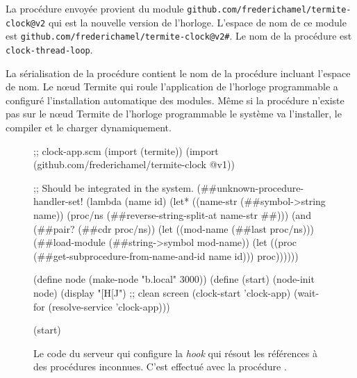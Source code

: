 La procédure envoyée provient du module \texttt{github.com/frederichamel/termite-clock@v2}
qui est la nouvelle version de l'horloge. L'espace de nom de ce module
est \texttt{github.com/frederichamel/termite-clock@v2\#}. Le nom de la procédure
est \texttt{clock-thread-loop}.

La sérialisation de la procédure contient le nom de la procédure incluant
l'espace de nom. Le nœud Termite qui roule l'application de l'horloge
programmable a configuré l'installation automatique des modules. Même si la
procédure n'existe pas sur le nœud Termite de l'horloge programmable le système
va l'installer, le compiler et le charger dynamiquement.


\begin{figure}[ht]
  \centering\fontsize{8}{7}
\begin{mplisting}{0.75}
;; clock-app.scm
(import (termite))
(import (github.com/frederichamel/termite-clock @v1))

;; Should be integrated in the system.
(##unknown-procedure-handler-set!
  (lambda (name id)
    (let* ((name-str (##symbol->string name))
           (proc/ns (##reverse-string-split-at name-str #\#)))
      (and (##pair? (##cdr proc/ns))
           (let ((mod-name (##last proc/ns)))
             (##load-module (##string->symbol mod-name))
             (let ((proc (##get-subprocedure-from-name-and-id name id)))
               proc))))))

(define node (make-node "b.local" 3000))
(define (start)
  (node-init node)
  (display "[H[J") ;; clean screen
  (clock-start 'clock-app)
  (wait-for (resolve-service 'clock-app)))

(start)
\end{mplisting}
  \caption{Le code du serveur qui configure la \textit{hook}
    qui résout les références à des procédures inconnues.
    C'est effectué avec la procédure
    .}
  \vspace*{4ex}
\end{figure}


